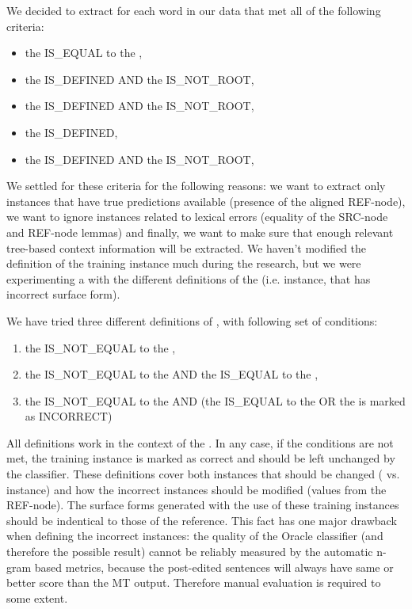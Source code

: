 We decided to extract  for each word in our data that met all of the following criteria:
\begin{itemize}
    \item the  IS\_EQUAL to the ,
    \item the  IS\_DEFINED AND\newline{}
        the  IS\_NOT\_ROOT,
    \item the  IS\_DEFINED AND\newline{}
        the  IS\_NOT\_ROOT,
    \item the  IS\_DEFINED,
    \item the  IS\_DEFINED AND\newline{}
        the  IS\_NOT\_ROOT,
\end{itemize}
We settled for these criteria for the following reasons: we want to extract only instances that have true predictions
available (presence of the aligned REF-node), we want to ignore  instances related
to lexical errors (equality of the SRC-node and REF-node lemmas) and finally, we want to make sure that
enough relevant tree-based context information will be extracted. We haven't modified the definition
of the training instance much during the research, but we were experimenting a with the different definitions
of the  (i.e. instance, that has incorrect surface form).

We have tried three different definitions of , with following set of conditions:
\begin{enumerate}
    \item the  IS\_NOT\_EQUAL to the ,
    \item the  IS\_NOT\_EQUAL to the  AND the  IS\_EQUAL to the ,
    \item the  IS\_NOT\_EQUAL to the  AND (the  IS\_EQUAL to the 
        OR the  is marked as INCORRECT)
\end{enumerate}
All definitions work in the context of the . In any case, if the conditions
are not met, the training instance is marked as correct and should be left unchanged by the classifier.
These definitions cover both instances that should be changed ( vs.  instance)
and how the incorrect instances should be modified (values from the REF-node). The surface forms
generated with the use of these training instances should be indentical to those of the reference.
This fact has one major drawback when defining the incorrect instances:
the quality of the Oracle classifier (and therefore the 
possible result) cannot be reliably measured by the automatic n-gram based metrics, because the post-edited
sentences will always have same or better score than the MT output. Therefore manual evaluation is required
to some extent.

